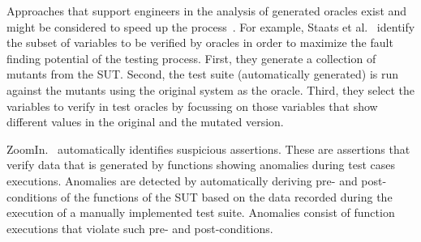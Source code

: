 Approaches that support engineers in the analysis of generated oracles exist and might be considered to speed up the process~\cite{Staats2012,PastoreICSE2015}. For example, 
Staats et al.~\cite{Staats2012} identify the subset of variables to be verified by oracles in order to maximize the fault finding potential of the testing process.
First, they generate a collection of mutants from the SUT. Second, the test suite (automatically generated) is run against the mutants using the original system as the oracle. Third, they select the variables to verify in test oracles by focussing on those variables that show different values in the original and the mutated version.

ZoomIn.~\cite{PastoreICSE2015} automatically identifies suspicious assertions. These are assertions that verify data that is generated by functions showing anomalies during test cases executions. Anomalies are detected by automatically deriving pre- and post-conditions of the functions of the SUT based on the data recorded during the execution of a manually implemented test suite. Anomalies consist of function executions that violate such pre- and post-conditions. 

